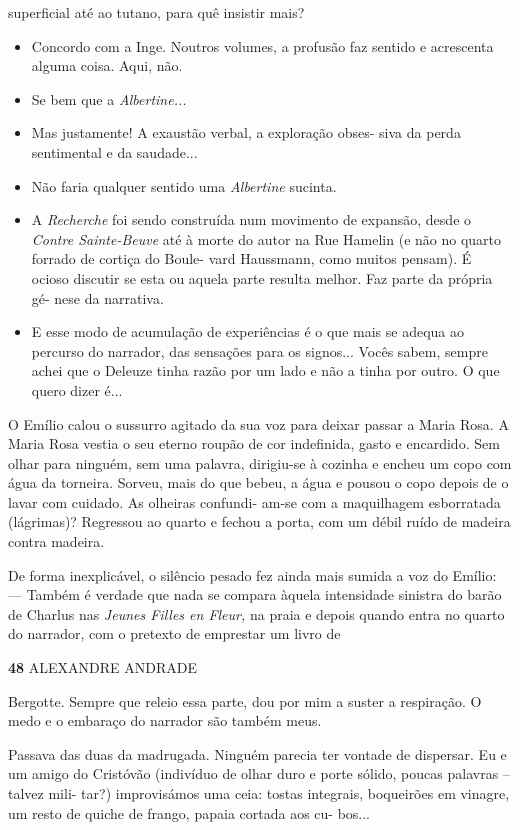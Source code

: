superficial até ao tutano, para quê insistir mais?

\begin{itemize}
\tightlist
\item
  Concordo com a Inge. Noutros volumes, a profusão faz sentido e
  acrescenta alguma coisa. Aqui, não.
\item
  Se bem que a \emph{Albertine...}
\item
  Mas justamente! A exaustão verbal, a exploração obses- siva da perda
  sentimental e da saudade...
\item
  Não faria qualquer sentido uma \emph{Albertine }sucinta.
\item
  A \emph{Recherche }foi sendo construída num movimento de expansão,
  desde o \emph{Contre Sainte-Beuve }até à morte do autor na Rue Hamelin
  (e não no quarto forrado de cortiça do Boule- vard Haussmann, como
  muitos pensam). É ocioso discutir se esta ou aquela parte resulta
  melhor. Faz parte da própria gé- nese da narrativa.
\item
  E esse modo de acumulação de experiências é o que mais se adequa ao
  percurso do narrador, das sensações para os signos... Vocês sabem,
  sempre achei que o Deleuze tinha razão por um lado e não a tinha por
  outro. O que quero dizer é...
\end{itemize}

O Emílio calou o sussurro agitado da sua voz para deixar passar a Maria
Rosa. A Maria Rosa vestia o seu eterno roupão de cor indefinida, gasto e
encardido. Sem olhar para ninguém, sem uma palavra, dirigiu-se à cozinha
e encheu um copo com água da torneira. Sorveu, mais do que bebeu, a água
e pousou o copo depois de o lavar com cuidado. As olheiras confundi-
am-se com a maquilhagem esborratada (lágrimas)? Regressou ao quarto e
fechou a porta, com um débil ruído de madeira contra madeira.

De forma inexplicável, o silêncio pesado fez ainda mais sumida a voz do
Emílio: --- Também é verdade que nada se compara àquela intensidade
sinistra do barão de Charlus nas \emph{Jeunes Filles en Fleur, }na praia
e depois quando entra no quarto do narrador, com o pretexto de emprestar
um livro de

\textbf{48 }ALEXANDRE ANDRADE

Bergotte. Sempre que releio essa parte, dou por mim a suster a
respiração. O medo e o embaraço do narrador são também meus.

Passava das duas da madrugada. Ninguém parecia ter vontade de dispersar.
Eu e um amigo do Cristóvão (indivíduo de olhar duro e porte sólido,
poucas palavras -- talvez mili- tar?) improvisámos uma ceia: tostas
integrais, boqueirões em vinagre, um resto de quiche de frango, papaia
cortada aos cu- bos...

